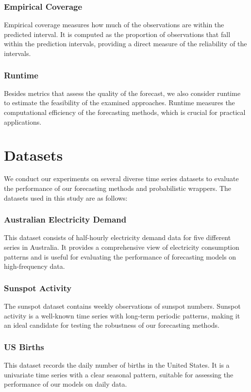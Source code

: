 \subsubsection{Empirical Coverage}
Empirical coverage measures how much of the observations are within the predicted interval. It is computed as the proportion of observations that fall within the prediction intervals, providing a direct measure of the reliability of the intervals.

\subsubsection{Runtime}
Besides metrics that assess the quality of the forecast, we also consider runtime to estimate the feasibility of the examined approaches. Runtime measures the computational efficiency of the forecasting methods, which is crucial for practical applications.

\section{Datasets} \label{datasets}
We conduct our experiments on several diverse time series datasets to evaluate the performance of our forecasting methods and probabilistic wrappers. The datasets used in this study are as follows:

\subsubsection{Australian Electricity Demand}
This dataset consists of half-hourly electricity demand data for five different series in Australia. It provides a comprehensive view of electricity consumption patterns and is useful for evaluating the performance of forecasting models on high-frequency data.

\subsubsection{Sunspot Activity}
The sunspot dataset contains weekly observations of sunspot numbers. Sunspot activity is a well-known time series with long-term periodic patterns, making it an ideal candidate for testing the robustness of our forecasting methods.

\subsubsection{US Births}
This dataset records the daily number of births in the United States. It is a univariate time series with a clear seasonal pattern, suitable for assessing the performance of our models on daily data.

